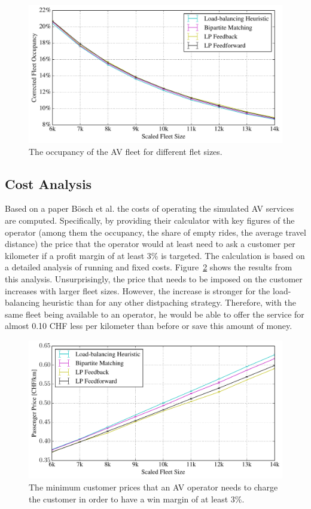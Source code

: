 \begin{figure}
\includegraphics[width=1.0\textwidth]{figures/occupancy.pdf}
\caption{The occupancy of the AV fleet for different flet sizes.}
\label{fig:occupancy}
\end{figure}

\subsection{Cost Analysis}
\label{sec:cost_analysis}

Based on a paper Bösch et al. \cite{cost_paper} the costs of operating the simulated
AV services are computed. Specifically, by providing their calculator with key
figures of the operator (among them the occupancy, the share of empty rides, the
average travel distance) the price that the operator would at least need to ask
a customer per kilometer if a profit margin of at least 3\% is targeted. The calculation
is based on a detailed analysis of running and fixed costs. Figure~\ref{fig:passenger_price}
shows the results from this analysis. Unsurprisingly, the price that needs to be
imposed on the customer increases with larger fleet sizes. However, the increase
is stronger for the load-balancing heuristic than for any other distpaching strategy.
Therefore, with the same fleet being available to an operator, he would be able
to offer the service for almost 0.10 CHF less per kilometer than before or save
this amount of money.

\begin{figure}
\includegraphics[width=1.0\textwidth]{figures/01_passenger_price.pdf}
\caption{The minimum customer prices that an AV operator needs to charge the customer
in order to have a win margin of at least 3\%.}
\label{fig:passenger_price}
\end{figure}

